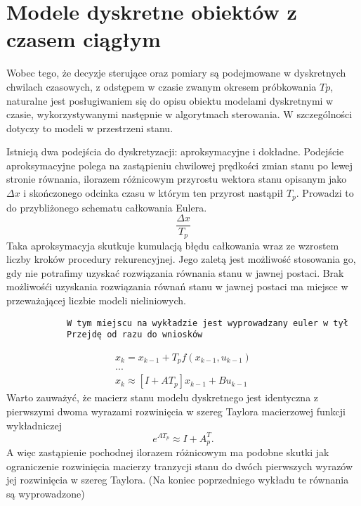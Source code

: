 \documentclass{article}
\begin{document}
	\section{Modele dyskretne obiektów z czasem ciągłym}
		Wobec tego, że decyzje sterujące oraz pomiary są
		podejmowane w dyskretnych chwilach czasowych, z odstępem w czasie zwanym
		okresem próbkowania $Tp$, naturalne jest posługiwaniem się do opisu obiektu modelami
		dyskretnymi w czasie, wykorzystywanymi następnie w algorytmach sterowania. W
		szczególności dotyczy to modeli w przestrzeni stanu.

		Istnieją dwa podejścia do dyskretyzacji: aproksymacyjne i dokładne. Podejście
		aproksymacyjne polega na zastąpieniu chwilowej prędkości zmian stanu po lewej stronie
		równania, ilorazem różnicowym przyrostu wektora stanu opisanym jako $\Delta x$
		i skończonego odcinka czasu w którym ten przyrost nastąpił $T_p$. Prowadzi to do
		przybliżonego schematu całkowania Eulera.
		\begin{equation}
			\frac{\Delta x}{T_p}
		\end{equation}
		Taka aproksymacyja skutkuje kumulacją błędu całkowania
		wraz ze wzrostem liczby kroków procedury rekurencyjnej. Jego zaletą jest możliwość
		stosowania go, gdy nie potrafimy uzyskać rozwiązania równania stanu w jawnej postaci.
		Brak możliwośći uzyskania rozwiązania równań stanu w jawnej postaci ma miejsce w
		przeważającej liczbie modeli nieliniowych.
		\begin{verbatim}
			W tym miejscu na wykładzie jest wyprowadzany euler w tył
			Przejdę od razu do wniosków
		\end{verbatim}
		
		\begin{align*}
			x_k = x_{k-1} + T_pf(x_{k-1}, u_{k-1}) \\
			... \\
			x_k \approx [I + AT_p] x_{k-1} + B u_{k-1}
		\end{align*}
		Warto zauważyć, że macierz stanu modelu dyskretnego jest identyczna z pierwszymi dwoma
		wyrazami rozwinięcia w szereg Taylora macierzowej funkcji wykładniczej
		\begin{equation}
			e^{AT_p} \approx I +A^T_p .
		\end{equation}
		A więc zastąpienie pochodnej ilorazem różnicowym ma podobne skutki jak ograniczenie
		rozwinięcia macierzy tranzycji stanu do dwóch pierwszych wyrazów jej rozwinięcia w
		szereg Taylora.
		(Na koniec poprzedniego wykładu te równania są wyprowadzone)
\end{document}
